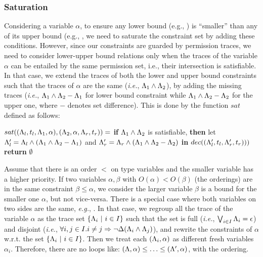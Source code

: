 {{{\subsubsection{\textbf{Saturation}}
Considering a variable $\alpha$, to ensure any lower bound (e.g., ) is ``smaller'' than any of its upper bound (e.g., , we need to saturate the constraint set by adding these conditions.
However, since our constraints are guarded by permission traces, we need to consider lower-upper bound relations only when the traces of the variable $\alpha$ can be entailed by the same permission set, i.e., their intersection is satisfiable. \iffalse (i.e., $\issatisfied{\trace_1 \land \trace_2} $)\fi In that case, we extend the traces of both the lower and upper bound constraints such that the traces of $\alpha$ are the same (\emph{i.e.}, $\Lambda_1 \land \Lambda_2$), by adding the missing traces (\emph{i.e.}, $\Lambda_1 \land \Lambda_2 - \Lambda_1$ for lower bound constraint while $\Lambda_1 \land \Lambda_2 - \Lambda_2$ for the upper one, where $-$ denotes set difference).
This is done by the function $sat$ defined as follows:

\begin{algorithmic}
\STATE $sat(({\Lambda_l},{t_l},{\Lambda_1},{\alpha}),({\Lambda_2},{\alpha},{\Lambda_r},{t_r}))=$
\STATE \quad \textbf{if} $\Lambda_1 \land \Lambda_2$ is satisfiable,
\textbf{then} let $\Lambda'_l = \Lambda_l\land (\Lambda_1 \land \Lambda_2-\Lambda_1)$ and $\Lambda'_r=\Lambda_r\land (\Lambda_1 \land \Lambda_2-\Lambda_2)$ \textbf{in} $dec(({\Lambda'_l },{t_l},{ \Lambda'_r},{t_r})))$
\STATE  \quad \textbf{return} $\emptyset$
\end{algorithmic}



Assume that there is an order $<$ on type variables and the smaller variable has a higher priority.
If two variables $\alpha, \beta$ with $O(\alpha) < O (\beta)$ (the orderings) are in the same constraint $\beta \leq \alpha$, we consider the larger variable $\beta$ is a bound for the smaller one $\alpha$, but not vice-versa.
There is a special case where both variables on two sides are the same, \emph{e.g.},  .
In that case, we regroup all the trace of the variable $\alpha$ as the trace set $\{\Lambda_i~|~i \in I\}$ such that the set is full (\emph{i.e.}, $\bigvee_{i\in I}\Lambda_i  = \epsilon$) and disjoint (\emph{i.e.}, $\forall i,j\in I. i\neq j \Rightarrow \neg\Delta(\Lambda_i\land\Lambda_j)$), and rewrite the constraints of $\alpha$ w.r.t. the set $\{\Lambda_i~|~i \in I\}$.  Then we treat each $(\Lambda_i, \alpha)$ as different fresh variables $\alpha_i$.
Therefore, there are no loops like: $(\Lambda,\alpha) \leq \ldots\leq (\Lambda',\alpha)$, with the ordering.

}}}
